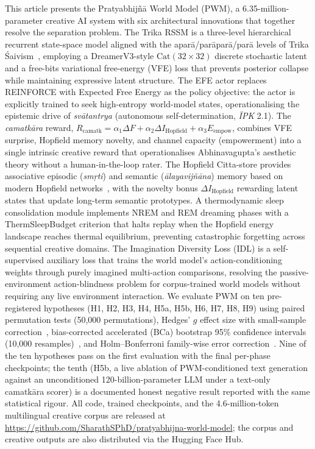 \documentclass[journal,onecolumn,11pt]{IEEEtran}
\begin{document}
This article presents the Pratyabhijñā World Model (PWM), a 6.35-million-parameter
creative AI system with six architectural innovations that together resolve the
separation problem.
The Trika RSSM is a three-level hierarchical recurrent state-space model
aligned with the aparā/parāparā/parā levels of Trika
Śaivism~\cite{abhinavagupta2012tantraloka,wallis2012tantra}, employing a
DreamerV3-style $\text{Cat}(32{\times}32)$ discrete stochastic latent and a
free-bits variational free-energy (VFE) loss that prevents posterior collapse
while maintaining expressive latent structure.
The EFE actor replaces REINFORCE with Expected Free Energy as the policy
objective: the actor is explicitly trained to seek high-entropy world-model
states, operationalising the epistemic drive of \emph{svātantrya}
(autonomous self-determination, \emph{ĪPK} 2.1).
The \emph{camatkāra} reward,
$R_{\text{camatk}} = \alpha_1 \Delta F + \alpha_2 \Delta I_{\text{Hopfield}}
+ \alpha_3 E_{\text{empow}}$, combines VFE surprise, Hopfield memory novelty,
and channel capacity (empowerment) into a single intrinsic creative reward
that operationalises Abhinavagupta's aesthetic theory without a
human-in-the-loop rater.
The Hopfield Citta-store provides associative episodic (\emph{smṛti}) and
semantic (\emph{ālayavijñāna}) memory based on modern Hopfield
networks~\cite{ramsauer2020hopfield}, with the novelty bonus
$\Delta I_{\text{Hopfield}}$ rewarding latent states that update long-term
semantic prototypes.
A thermodynamic sleep consolidation module implements NREM and REM dreaming
phases with a ThermSleepBudget criterion that halts replay when the Hopfield
energy landscape reaches thermal equilibrium, preventing catastrophic
forgetting across sequential creative domains.
The Imagination Diversity Loss (IDL) is a self-supervised auxiliary loss
that trains the world model's action-conditioning weights through purely
imagined multi-action comparisons, resolving the
passive-environment action-blindness problem for corpus-trained world models
without requiring any live environment interaction.
We evaluate PWM on ten pre-registered hypotheses (H1, H2, H3, H4, H5a, H5b,
H6, H7, H8, H9) using paired permutation tests (50{,}000 permutations),
Hedges' $g$ effect size with small-sample correction~\cite{hedges1981distribution},
bias-corrected accelerated (BCa) bootstrap 95\% confidence intervals
(10{,}000 resamples)~\cite{efron1987bootstrap}, and Holm--Bonferroni
family-wise error correction~\cite{holm1979simple}.
Nine of the ten hypotheses pass on the first evaluation with the final
per-phase checkpoints; the tenth (H5b, a live ablation of PWM-conditioned
text generation against an unconditioned 120-billion-parameter LLM under a
text-only camatkāra scorer) is a documented honest negative result reported
with the same statistical rigour.
All code, trained checkpoints, and the 4.6-million-token multilingual creative
corpus are released at
\url{https://github.com/SharathSPhD/pratyabhijna-world-model}; the corpus
and creative outputs are also distributed via the Hugging Face Hub.
\end{document}
